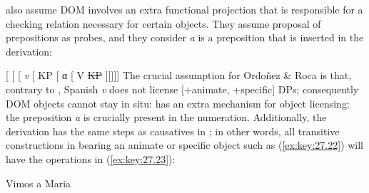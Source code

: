 \documentclass[output=paper]{langsci/langscibook}
\begin{document}
\ea\label{ex:key:27.20} 
    \z
\z
\textcite{OrdonezRoca2017} also assume DOM
involves an extra functional projection that is responsible for a checking
relation necessary for certain objects. They assume 
proposal of prepositions as probes, and they consider \emph{a} is a preposition
that is inserted in the derivation:

\ea\label{ex:key:27.21}
    [ [ [ \emph{v}   [ KP
     [ α [ V \sout{KP} ]]]]]
    \vspace{2em}
\z
The crucial assumption for Ordoñez \& Roca is that, contrary to ,
Spanish \emph{v} does not license [$+$animate, +specific] DPs; consequently
DOM objects cannot stay in situ: 
has an extra mechanism for object licensing: the preposition \emph{a} is
crucially present in the numeration.  Additionally, the derivation has the same
steps as causatives in ; in other words, all transitive
constructions in  bearing an animate or specific object such as
(\ref{ex:key:27.22}) will have the operations in (\ref{ex:key:27.23}):

\ea\label{ex:key:27.22}
    Vimos a Maria
\z
\end{document}
